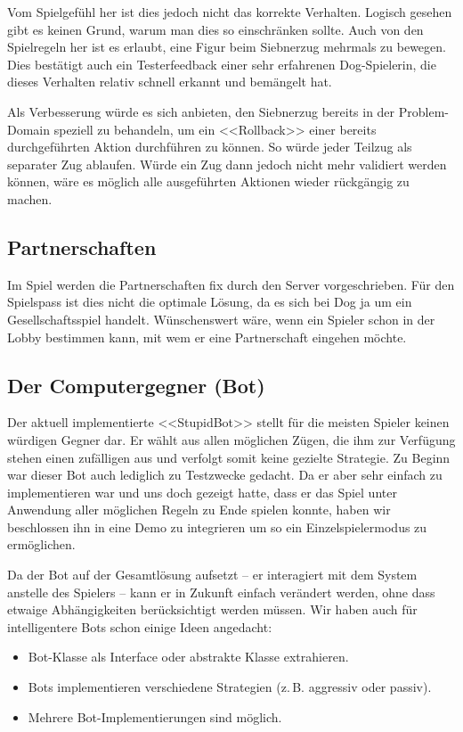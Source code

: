 \documentclass[12pt,halfparskip]{scrartcl}
\begin{document}
Vom Spielgefühl her ist dies jedoch nicht das korrekte Verhalten. Logisch gesehen gibt es keinen Grund, warum man dies so einschränken sollte. Auch von den Spielregeln her ist es erlaubt, eine Figur beim Siebnerzug mehrmals zu bewegen. Dies bestätigt auch ein Testerfeedback einer sehr erfahrenen Dog-Spielerin, die dieses Verhalten relativ schnell erkannt und bemängelt hat.

Als Verbesserung würde es sich anbieten, den Siebnerzug bereits in der Problem-Domain speziell zu behandeln, um ein <<Rollback>> einer bereits durchgeführten Aktion durchführen zu können. So würde jeder Teilzug als separater Zug ablaufen. Würde ein Zug dann jedoch nicht mehr validiert werden können, wäre es möglich alle ausgeführten Aktionen wieder rückgängig zu machen.

\subsection{Partnerschaften}
Im Spiel werden die Partnerschaften fix durch den Server vorgeschrieben. Für den Spielspass ist dies nicht die optimale Lösung, da es sich bei Dog ja um ein Gesellschaftsspiel handelt. Wünschenswert wäre, wenn ein Spieler schon in der Lobby bestimmen kann, mit wem er eine Partnerschaft eingehen möchte.

\subsection{Der Computergegner (Bot)}
Der aktuell implementierte <<StupidBot>> stellt für die meisten Spieler keinen würdigen Gegner dar. Er wählt aus allen möglichen Zügen, die ihm zur Verfügung stehen einen zufälligen aus und verfolgt somit keine gezielte Strategie. Zu Beginn war dieser Bot auch lediglich zu Testzwecke gedacht. Da er aber sehr einfach zu implementieren war und uns doch gezeigt hatte, dass er das Spiel unter Anwendung aller möglichen Regeln zu Ende spielen konnte, haben wir beschlossen ihn in eine Demo zu integrieren um so ein Einzelspielermodus zu ermöglichen.

Da der Bot auf der Gesamtlösung aufsetzt -- er interagiert mit dem System anstelle des Spielers -- kann er in Zukunft einfach verändert werden, ohne dass etwaige Abhängigkeiten berücksichtigt werden müssen. Wir haben auch für intelligentere Bots schon einige Ideen angedacht:
\begin{itemize}
	\item Bot-Klasse als Interface oder abstrakte Klasse extrahieren.
	\item Bots implementieren verschiedene Strategien (z.\,B. aggressiv oder passiv).
	\item Mehrere Bot-Implementierungen sind möglich.
\end{itemize}
\end{document}
